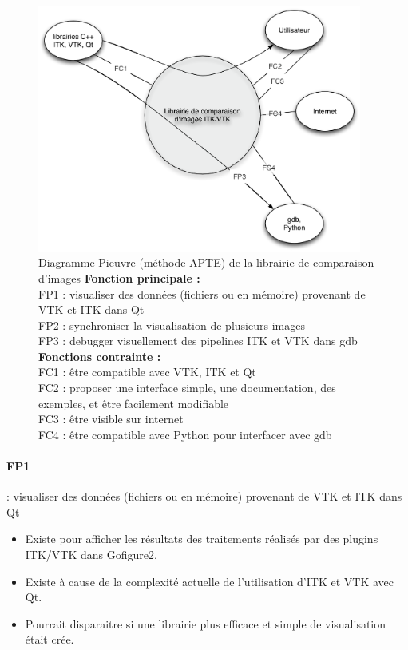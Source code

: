 \begin{figure}[H]
\begin{center}
\leavevmode
\includegraphics[width=0.95\textwidth]{pictures/ComparePIEUVRE}
\end{center}
\caption[Diagramme Pieuvre (méthode {APTE\textregistered}) de la librairie de comparaison d'images]{Diagramme Pieuvre (méthode {APTE\textregistered}) de la librairie de comparaison d'images
\small
\textbf{Fonction principale :}\\
FP1 : visualiser des données (fichiers ou en mémoire) provenant de VTK et ITK dans Qt\\
FP2 : synchroniser la visualisation de plusieurs images\\
FP3 : debugger visuellement des pipelines ITK et VTK dans gdb\\
\textbf{Fonctions contrainte :} \\
FC1 : être compatible avec VTK, ITK et Qt\\
FC2 : proposer une interface simple, une documentation, des exemples, et être facilement modifiable\\
FC3 : être visible sur internet\\
FC4 : être compatible avec Python pour interfacer avec gdb}
\label{fig:PIEUVRECompare}
\end{figure}

\paragraph*{FP1} : visualiser des données (fichiers ou en mémoire) provenant de VTK et ITK dans Qt
\begin{itemize}
  \item Existe pour afficher les résultats des traitements réalisés par des plugins ITK/VTK dans Gofigure2.
  \item Existe à cause de la complexité actuelle de l'utilisation d'ITK et VTK avec Qt. 
  \item Pourrait disparaitre si une librairie plus efficace et simple de visualisation était crée.
\end{itemize}


